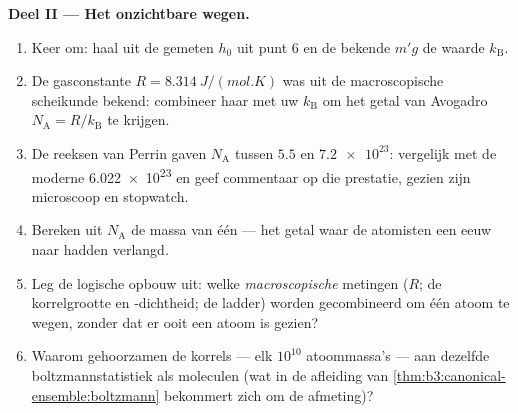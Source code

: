 \begin{problem}
\medskip\noindent\textbf{Deel II --- Het onzichtbare wegen.}
\begin{enumerate}[resume]
  \item Keer om: haal uit de gemeten $h_0$ uit punt 6 en de bekende $m'g$
        de waarde $k_{\text{B}}$.
  \item De gasconstante $R = \qty{8.314}{J/(mol.K)}$ was uit de
        macroscopische scheikunde bekend: combineer haar met uw
        $k_{\text{B}}$ om het getal van Avogadro $N_{\text{A}} =
        R/k_{\text{B}}$ te krijgen.
  \item De reeksen van Perrin gaven $N_{\text{A}}$ tussen $5.5$ en
        $\num{7.2e23}$: vergelijk met de moderne \num{6.022e23} en geef
        commentaar op die prestatie, gezien zijn microscoop en stopwatch.
  \item Bereken uit $N_{\text{A}}$ de massa van één  --- het
        getal waar de atomisten een eeuw naar hadden verlangd.
  \item Leg de logische opbouw uit: welke \emph{macroscopische} metingen
        ($R$; de korrelgrootte en -dichtheid; de ladder) worden gecombineerd
        om één atoom te wegen, zonder dat er ooit een atoom is gezien?
  \item Waarom gehoorzamen de korrels --- elk $10^{10}$ atoommassa's ---
        aan dezelfde boltzmannstatistiek als moleculen (wat in de afleiding
        van \cref{thm:b3:canonical-ensemble:boltzmann} bekommert zich om
        de afmeting)?
\end{enumerate}


\end{problem}
